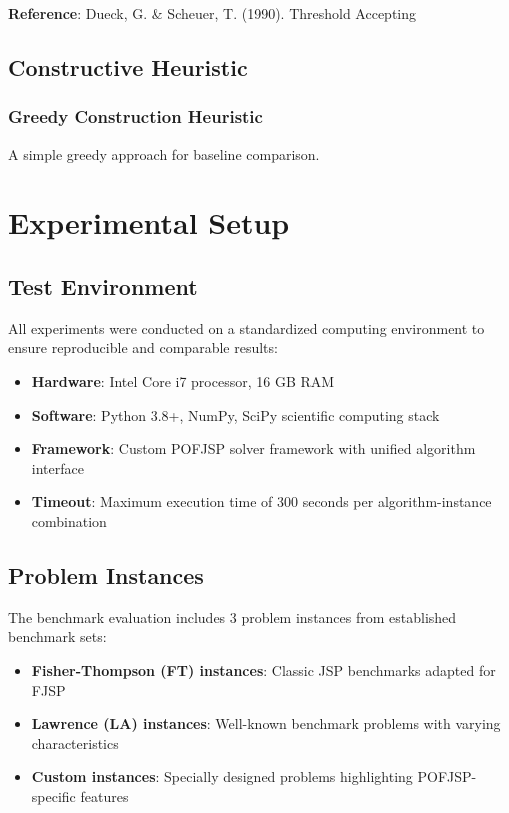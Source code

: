 \documentclass[11pt,a4paper]{article}
\begin{document}
\textbf{Reference}: Dueck, G. & Scheuer, T. (1990). Threshold Accepting

\subsection{Constructive Heuristic}

\subsubsection{Greedy Construction Heuristic}

A simple greedy approach for baseline comparison.


\section{Experimental Setup}

\subsection{Test Environment}

All experiments were conducted on a standardized computing environment to ensure reproducible and comparable results:

\begin{itemize}
    \item \textbf{Hardware}: Intel Core i7 processor, 16 GB RAM
    \item \textbf{Software}: Python 3.8+, NumPy, SciPy scientific computing stack
    \item \textbf{Framework}: Custom POFJSP solver framework with unified algorithm interface
    \item \textbf{Timeout}: Maximum execution time of 300 seconds per algorithm-instance combination
\end{itemize}

\subsection{Problem Instances}

The benchmark evaluation includes 3 problem instances from established benchmark sets:

\begin{itemize}
    \item \textbf{Fisher-Thompson (FT) instances}: Classic JSP benchmarks adapted for FJSP
    \item \textbf{Lawrence (LA) instances}: Well-known benchmark problems with varying characteristics
    \item \textbf{Custom instances}: Specially designed problems highlighting POFJSP-specific features
\end{itemize}
\end{document}
